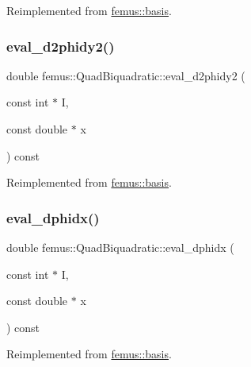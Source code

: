 Reimplemented from \mbox{\hyperlink{classfemus_1_1basis_ac9feaf9e60421143db2a3708f3c7fa48}{femus\+::basis}}.

\mbox{\label{classfemus_1_1_quad_biquadratic_a53f8f00fa4999cb1cfcdaf3f6a98df24}} 
\subsubsection{\texorpdfstring{eval\+\_\+d2phidy2()}{eval\_d2phidy2()}}
{\footnotesize\ttfamily double femus\+::\+Quad\+Biquadratic\+::eval\+\_\+d2phidy2 (\begin{DoxyParamCaption}\item[{const int $\ast$}]{I,  }\item[{const double $\ast$}]{x }\end{DoxyParamCaption}) const\hspace{0.3cm}{\ttfamily [virtual]}}



Reimplemented from \mbox{\hyperlink{classfemus_1_1basis_a0febb29fe4b32213ff8d6d428f7241cd}{femus\+::basis}}.

\mbox{\label{classfemus_1_1_quad_biquadratic_acbc937c5ad4cda84236ba956b4fb0fae}} 
\subsubsection{\texorpdfstring{eval\+\_\+dphidx()}{eval\_dphidx()}}
{\footnotesize\ttfamily double femus\+::\+Quad\+Biquadratic\+::eval\+\_\+dphidx (\begin{DoxyParamCaption}\item[{const int $\ast$}]{I,  }\item[{const double $\ast$}]{x }\end{DoxyParamCaption}) const\hspace{0.3cm}{\ttfamily [virtual]}}



Reimplemented from \mbox{\hyperlink{classfemus_1_1basis_a4db7d29cf8a753ddbccc4a297dafa0bf}{femus\+::basis}}.

